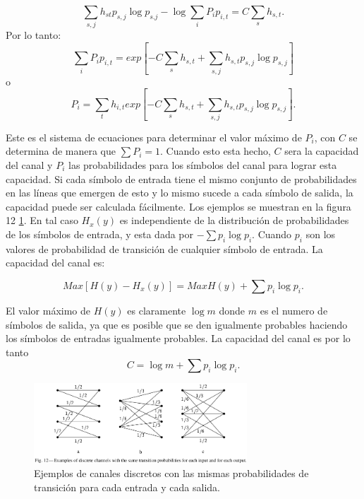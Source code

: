 \begin{equation}
  \sum_{s,j}h_{st} p_{s,j} \log{p_{s.j}} - \log{\sum_{i}P_i p_{i,t}} = C \sum_{s} h_{s,t}.
\end{equation}
Por lo tanto:
\begin{equation}
  \sum_{i} P_i p_{i,t} = exp[- C \sum_{s} h_{s,t}+ \sum_{s,j} h_{s,t} p_{s,j} \log{p_{s,j}}]
\end{equation}
o  
\begin{equation}
  P_i = \sum_{t} h_{i,t} exp[ - C \sum_{s} h_{s,t}+ \sum_{s,j} h_{s,t} p_{s,j} \log{p_{s,j}} ].
\end{equation}

Este es el sistema de ecuaciones para determinar el valor m\'aximo de $P_i$, con $C$ se determina de 
manera que $\sum P_i = 1$. Cuando esto esta hecho, $C$ sera la capacidad del canal y $P_i$ las probabilidades
para los s\'imbolos del canal para lograr esta capacidad.  
Si cada s\'imbolo de entrada tiene el mismo conjunto de probabilidades en las l\'ineas que emergen de esto y lo mismo 
sucede a cada s\'imbolo de salida, la capacidad puede ser calculada f\'acilmente. Los ejemplos se muestran en la figura 12 \ref{fig:12}.  
En tal caso $H_x (y)$ es independiente de la distribuci\'on de probabilidades de los s\'imbolos de entrada, y esta dada por 
$-\sum p_i \log{p_i}$. Cuando $p_i$ son los valores de probabilidad de transici\'on de cualquier s\'imbolo de entrada. La
capacidad del canal es:

\begin{equation}
  Max [H(y) - H_x(y)] = Max H(y) + \sum p_i \log{p_i}.
\end{equation}

El valor m\'aximo de $H(y)$ es claramente  $\log{m}$ donde $m$ es el numero de s\'imbolos de salida, ya que es posible que se den 
igualmente probables haciendo los s\'imbolos de entradas igualmente probables. La capacidad del canal es por lo tanto
\begin{equation}
  C = \log{m} + \sum p_i \log{p_i}.
\end{equation}

\begin{figure}[!ht]
\centerline{\includegraphics[width=80mm]{Imagenes/Pagina27-Figura12.png}}
\caption{Ejemplos de canales discretos con las mismas probabilidades de
 transici\'{o}n para cada entrada y cada salida.}
\label{fig:12}
\end{figure}


